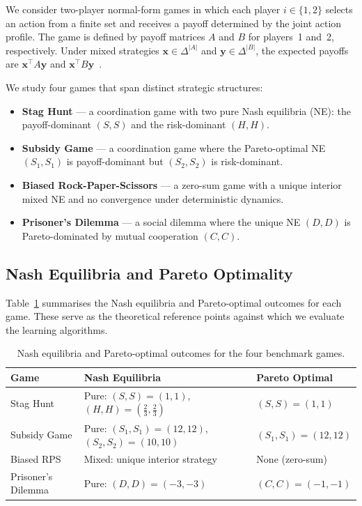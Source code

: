 \documentclass[11pt,a4paper]{article}
\begin{document}
We consider two-player normal-form games in which each player $i \in \{1,2\}$ selects an action from a finite set and receives a payoff determined by the joint action profile. The game is defined by payoff matrices $A$ and $B$ for players~1 and~2, respectively. Under mixed strategies $\mathbf{x} \in \Delta^{|A|}$ and $\mathbf{y} \in \Delta^{|B|}$, the expected payoffs are $\mathbf{x}^\top A \mathbf{y}$ and $\mathbf{x}^\top B \mathbf{y}$~\citep{nash1950}.

We study four games that span distinct strategic structures:

\begin{itemize}[noitemsep]
  \item \textbf{Stag Hunt} --- a coordination game with two pure Nash equilibria (NE): the payoff-dominant $(S,S)$ and the risk-dominant $(H,H)$.
  \item \textbf{Subsidy Game} --- a coordination game where the Pareto-optimal NE $(S_1,S_1)$ is payoff-dominant but $(S_2,S_2)$ is risk-dominant.
  \item \textbf{Biased Rock-Paper-Scissors} --- a zero-sum game with a unique interior mixed NE and no convergence under deterministic dynamics.
  \item \textbf{Prisoner's Dilemma} --- a social dilemma where the unique NE $(D,D)$ is Pareto-dominated by mutual cooperation $(C,C)$.
\end{itemize}

\subsection{Nash Equilibria and Pareto Optimality}
\label{sec:nash}

Table~\ref{tab:nash} summarises the Nash equilibria and Pareto-optimal outcomes for each game. These serve as the theoretical reference points against which we evaluate the learning algorithms.

\begin{table}[H]
\centering
\caption{Nash equilibria and Pareto-optimal outcomes for the four benchmark games.}
\label{tab:nash}
\renewcommand{\arraystretch}{1.3}
\begin{tabular}{p{4cm}|p{4cm}|p{4cm}}
\toprule
\textbf{Game} & \textbf{Nash Equilibria} & \textbf{Pareto Optimal} \\
\midrule
Stag Hunt &
  Pure: $(S,S){=}(1,1)$, $(H,H){=}(\frac{2}{3},\frac{2}{3})$ &
  $(S,S){=}(1,1)$ \\
\hline
Subsidy Game &
  Pure: $(S_1,S_1){=}(12,12)$, $(S_2,S_2){=}(10,10)$ &
  $(S_1,S_1){=}(12,12)$ \\
\hline
Biased RPS &
  Mixed: unique interior strategy &
  None (zero-sum) \\
\hline
Prisoner's Dilemma &
  Pure: $(D,D){=}(-3,-3)$ &
  $(C,C){=}(-1,-1)$ \\
\bottomrule
\end{tabular}
\end{table}
\end{document}
